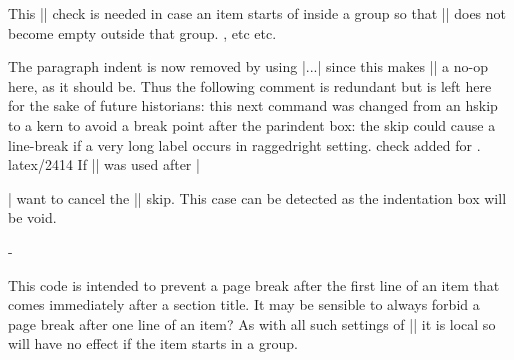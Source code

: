 \begin{texcode}{}{}
     \begin{teX}
\def\@item[#1]{%
  \if@noparitem
    \@donoparitem
  \else
    \if@inlabel
      \indent \par
    \fi
    \ifhmode
      \unskip\unskip \par
    \fi
    \if@newlist
      \if@nobreak
        \@nbitem
      \else
        \addpenalty\@beginparpenalty
        \addvspace\@topsep
        \addvspace{-\parskip}%
      \fi
    \else
      \addpenalty\@itempenalty
      \addvspace\itemsep
    \fi
    \global\@inlabeltrue
  \fi
  \everypar{%
    \@minipagefalse
    \global\@newlistfalse
    \end{teX}
    This |\if@inlabel| check is needed in case an item starts of
    inside a group so that |\everypar| does not become empty
    outside that group. 
 \@nobreakfalse, etc etc.
    \begin{teX}
    \if@inlabel
      \global\@inlabelfalse
    \end{teX}
    The paragraph indent is now removed by using |\setbox...| since
    this makes |\noindent| a no-op here, as it should be. Thus the
    following comment is redundant but is left here for the sake of
    future historians:
    this next command was changed from an hskip to a kern to avoid
    a break point after the parindent box: the skip could cause a
    line-break if a very long label occurs in raggedright setting.
    { check added for . latex/2414}
 If |\noindent| was used after |\item| want to cancel the |\itemindent|
 skip. This case can be detected as the indentation box will be void.
    \begin{teX}
      {\setbox\z@\lastbox
       \ifvoid\z@
         \kern-\itemindent
       \fi}%
    \end{teX}

    \begin{teX}
      \box\@labels
      \penalty\z@
    \fi
    \end{teX}
    This code is intended to prevent a page break after the first
    line of an item that comes immediately after a section title. It
    may be sensible to always forbid a page break after one line of
    an item?  As with all such settings of |\clubpenalty| it is local
    so will have no effect if the item starts in a group.


\end{texcode}
